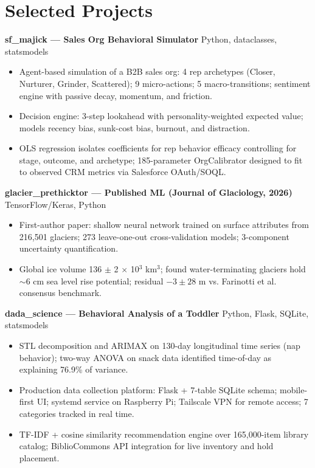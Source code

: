 \documentclass[11pt,a4paper]{article}
\begin{document}
\section*{Selected Projects}

\noindent
\textbf{sf\_majick --- Sales Org Behavioral Simulator} \hfill Python, dataclasses, statsmodels
\begin{itemize}
    \item Agent-based simulation of a B2B sales org: 4 rep archetypes (Closer, Nurturer, Grinder, Scattered); 9 micro-actions; 5 macro-transitions; sentiment engine with passive decay, momentum, and friction.
    \item Decision engine: 3-step lookahead with personality-weighted expected value; models recency bias, sunk-cost bias, burnout, and distraction.
    \item OLS regression isolates coefficients for rep behavior efficacy controlling for stage, outcome, and archetype; 185-parameter OrgCalibrator designed to fit to observed CRM metrics via Salesforce OAuth/SOQL.
\end{itemize}

\vspace{0.2cm}
\noindent
\textbf{glacier\_prethicktor --- Published ML (Journal of Glaciology, 2026)} \hfill TensorFlow/Keras, Python
\begin{itemize}
    \item First-author paper: shallow neural network trained on surface attributes from 216,501 glaciers; 273 leave-one-out cross-validation models; 3-component uncertainty quantification.
    \item Global ice volume 136 $\pm$ 2 $\times$ 10$^3$ km$^3$; found water-terminating glaciers hold $\sim$6 cm sea level rise potential; residual $-3 \pm 28$ m vs. Farinotti et al. consensus benchmark.
\end{itemize}

\vspace{0.2cm}
\noindent
\textbf{dada\_science --- Behavioral Analysis of a Toddler} \hfill Python, Flask, SQLite, statsmodels
\begin{itemize}
    \item STL decomposition and ARIMAX on 130-day longitudinal time series (nap behavior); two-way ANOVA on snack data identified time-of-day as explaining 76.9\% of variance.
    \item Production data collection platform: Flask + 7-table SQLite schema; mobile-first UI; systemd service on Raspberry Pi; Tailscale VPN for remote access; 7 categories tracked in real time.
    \item TF-IDF + cosine similarity recommendation engine over 165,000-item library catalog; BiblioCommons API integration for live inventory and hold placement.
\end{itemize}
\end{document}
